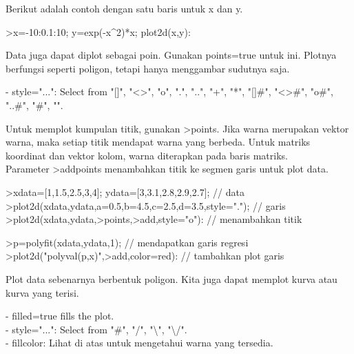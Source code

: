 \documentclass{article}
\begin{document}
\begin{eulernotebook}
\begin{eulercomment}
\begin{eulercomment}
\begin{eulercomment}
\begin{eulercomment}
\begin{eulercomment}
Berikut adalah contoh dengan satu baris untuk x dan y.

\end{eulercomment}
\begin{eulerprompt}
>x=-10:0.1:10; y=exp(-x^2)*x; plot2d(x,y):
\end{eulerprompt}
\begin{eulercomment}
Data juga dapat diplot sebagai poin. Gunakan points=true untuk ini.
Plotnya berfungsi seperti poligon, tetapi hanya menggambar sudutnya
saja.

- style="...": Select from "[]", "\textless{}\textgreater{}", "o", ".", "..", "+", "*",
"[]#", "\textless{}\textgreater{}#", "o#", "..#", "#", "\textbar{}".

Untuk memplot kumpulan titik, gunakan \textgreater{}points. Jika warna merupakan
vektor warna, maka setiap titik mendapat warna yang berbeda. Untuk
matriks koordinat dan vektor kolom, warna diterapkan pada baris
matriks.\\
Parameter \textgreater{}addpoints menambahkan titik ke segmen garis untuk plot
data.
\end{eulercomment}
\begin{eulerprompt}
>xdata=[1,1.5,2.5,3,4]; ydata=[3,3.1,2.8,2.9,2.7]; // data
>plot2d(xdata,ydata,a=0.5,b=4.5,c=2.5,d=3.5,style="."); // garis
>plot2d(xdata,ydata,>points,>add,style="o"): // menambahkan titik
\end{eulerprompt}
\begin{eulerprompt}
>p=polyfit(xdata,ydata,1); // mendapatkan garis regresi
>plot2d("polyval(p,x)",>add,color=red): // tambahkan plot garis
\end{eulerprompt}
\begin{eulercomment}
Plot data sebenarnya berbentuk poligon. Kita juga dapat memplot kurva
atau kurva yang terisi.

- filled=true fills the plot.\\
- style="...": Select from "#", "/", "\textbackslash{}", "\textbackslash{}/".\\
- fillcolor: Lihat di atas untuk mengetahui warna yang tersedia.


\end{eulercomment}
\end{eulercomment}
\end{eulercomment}
\end{eulercomment}
\end{eulercomment}
\end{eulernotebook}
\end{document}
